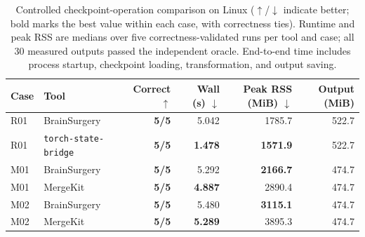 \begin{table}[t]
\centering
\small
\begin{tabular}{llrrrr}
\toprule
\textbf{Case} & \textbf{Tool} & \textbf{Correct $\uparrow$} & \textbf{Wall (s) $\downarrow$} & \textbf{Peak RSS (MiB) $\downarrow$} & \textbf{Output (MiB)} \\
\midrule
R01 & BrainSurgery & \textbf{5/5} & 5.042 & 1785.7 & 522.7 \\
R01 & \texttt{torch-state-bridge} & \textbf{5/5} & \textbf{1.478} & \textbf{1571.9} & 522.7 \\
M01 & BrainSurgery & \textbf{5/5} & 5.292 & \textbf{2166.7} & 474.7 \\
M01 & MergeKit & \textbf{5/5} & \textbf{4.887} & 2890.4 & 474.7 \\
M02 & BrainSurgery & \textbf{5/5} & 5.480 & \textbf{3115.1} & 474.7 \\
M02 & MergeKit & \textbf{5/5} & \textbf{5.289} & 3895.3 & 474.7 \\
\bottomrule
\end{tabular}
\caption{Controlled checkpoint-operation comparison on Linux ($\uparrow$/$\downarrow$ indicate better; bold marks the best value within each case, with correctness ties). Runtime and peak RSS are medians over five correctness-validated runs per tool and case; all 30 measured outputs passed the independent oracle. End-to-end time includes process startup, checkpoint loading, transformation, and output saving.}
\label{tab:competing-tools}
\end{table}
